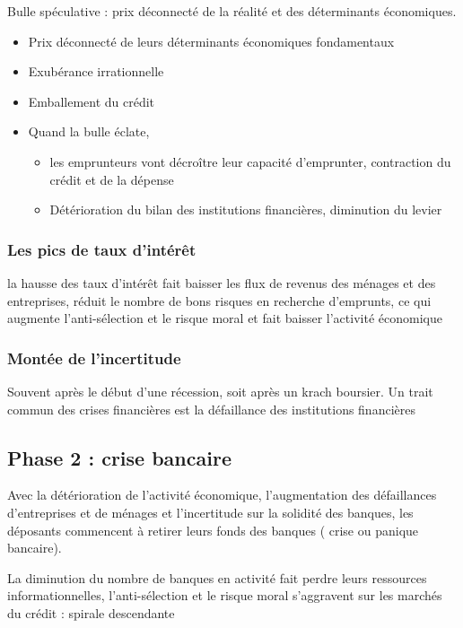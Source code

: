 	Bulle spéculative : prix déconnecté de la réalité et des déterminants économiques.
	
	\begin{itemize}
		\item Prix déconnecté de leurs déterminants économiques fondamentaux 
		\item Exubérance irrationnelle 
		\item Emballement du crédit 
		\item Quand la bulle éclate, 
		\begin{itemize}
			\item les emprunteurs vont décroître leur capacité d'emprunter, contraction du crédit et de la dépense 
			\item Détérioration du bilan des institutions financières, diminution du levier
		\end{itemize}
	\end{itemize}
	
	\subsubsection{Les pics de taux d'intérêt}
	
	la hausse des taux d'intérêt fait baisser les flux de revenus des 
ménages et des entreprises, réduit le nombre de bons risques en 
recherche d'emprunts, ce qui augmente l'anti-sélection et le risque 
moral et fait baisser l'activité économique

	\subsubsection{Montée de l'incertitude}
	Souvent après le début d'une récession, soit après un krach boursier. Un trait commun des crises financières est la défaillance des institutions financières
	

	\subsection{Phase 2 : crise bancaire}
	
	Avec la détérioration de l'activité économique, l'augmentation des 
défaillances d'entreprises et de ménages et l'incertitude sur la solidité des banques, les déposants commencent à retirer leurs fonds des banques ( crise ou panique bancaire).

	La diminution du nombre de banques en activité fait perdre leurs ressources informationnelles, l'anti-sélection et le risque moral s'aggravent sur les marchés du crédit : spirale descendante


